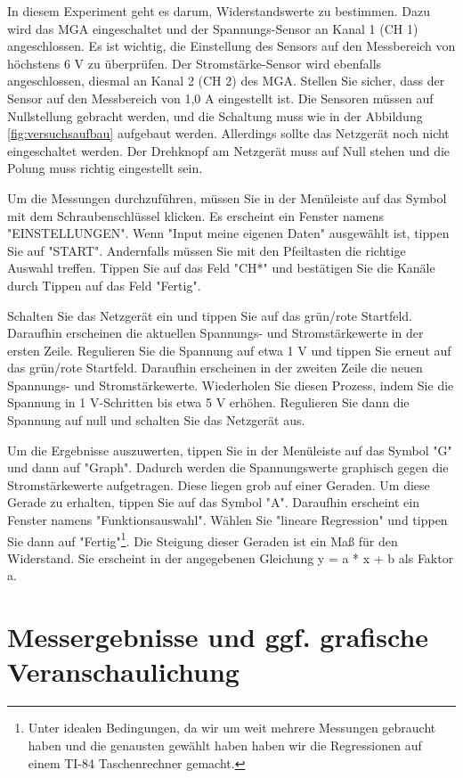 \documentclass[10pt]{article}
\begin{document}
In diesem Experiment geht es darum, Widerstandswerte zu bestimmen. Dazu wird das MGA eingeschaltet und der Spannungs-Sensor an Kanal 1 (CH 1) angeschlossen. Es ist wichtig, die Einstellung des Sensors auf den Messbereich von höchstens 6 V zu überprüfen. Der Stromstärke-Sensor wird ebenfalls angeschlossen, diesmal an Kanal 2 (CH 2) des MGA. Stellen Sie sicher, dass der Sensor auf den Messbereich von 1,0 A eingestellt ist. Die Sensoren müssen auf Nullstellung gebracht werden, und die Schaltung muss wie in der Abbildung \ref{fig:versuchsaufbau} aufgebaut werden. Allerdings sollte das Netzgerät noch nicht eingeschaltet werden. Der Drehknopf am Netzgerät muss auf Null stehen und die Polung muss richtig eingestellt sein.

Um die Messungen durchzuführen, müssen Sie in der Menüleiste auf das Symbol mit dem Schraubenschlüssel klicken. Es erscheint ein Fenster namens "EINSTELLUNGEN". Wenn "Input meine eigenen Daten" ausgewählt ist, tippen Sie auf "START". Andernfalls müssen Sie mit den Pfeiltasten die richtige Auswahl treffen. Tippen Sie auf das Feld "CH*" und bestätigen Sie die Kanäle durch Tippen auf das Feld "Fertig".

Schalten Sie das Netzgerät ein und tippen Sie auf das grün/rote Startfeld. Daraufhin erscheinen die aktuellen Spannungs- und Stromstärkewerte in der ersten Zeile. Regulieren Sie die Spannung auf etwa 1 V und tippen Sie erneut auf das grün/rote Startfeld. Daraufhin erscheinen in der zweiten Zeile die neuen Spannungs- und Stromstärkewerte. Wiederholen Sie diesen Prozess, indem Sie die Spannung in 1 V-Schritten bis etwa 5 V erhöhen. Regulieren Sie dann die Spannung auf null und schalten Sie das Netzgerät aus.

Um die Ergebnisse auszuwerten, tippen Sie in der Menüleiste auf das Symbol "G" und dann auf "Graph". Dadurch werden die Spannungswerte graphisch gegen die Stromstärkewerte aufgetragen. Diese liegen grob auf einer Geraden. Um diese Gerade zu erhalten, tippen Sie auf das Symbol "A". Daraufhin erscheint ein Fenster namens "Funktionsauswahl". Wählen Sie "lineare Regression" und tippen Sie dann auf "Fertig"\footnote{Unter idealen Bedingungen, da wir um weit mehrere Messungen gebraucht haben und die genausten gewählt haben haben wir die Regressionen auf einem TI-84 Taschenrechner gemacht.}. Die Steigung dieser Geraden ist ein Maß für den Widerstand. Sie erscheint in der angegebenen Gleichung y = a * x + b als Faktor a. 


\section{Messergebnisse und ggf. grafische Veranschaulichung}
\end{document}
